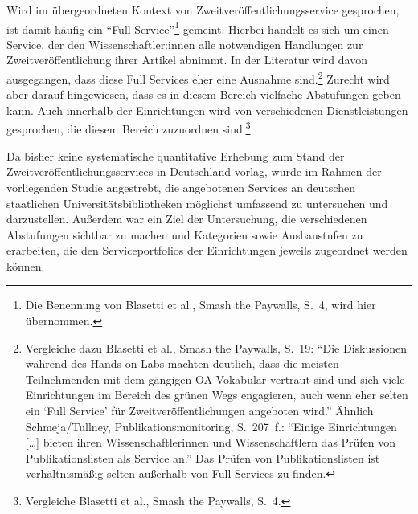 \documentclass[a4paper,
fontsize=11pt,
oneside,
numbers=noperiodatend,
parskip=half-,
bibliography=totoc,
final
]{scrartcl}
\begin{document}
Wird im übergeordneten Kontext von Zweitveröffentlichungsservice
gesprochen, ist damit häufig ein \enquote{Full Service}\footnote{Die
  Benennung von Blasetti et al., Smash the Paywalls, S.~4, wird hier
  übernommen.} gemeint. Hierbei handelt es sich um einen Service, der
den Wissenschaftler:innen alle notwendigen Handlungen zur
Zweitveröffentlichung ihrer Artikel abnimmt. In der Literatur wird davon
ausgegangen, dass diese Full Services eher eine Ausnahme
sind.\footnote{Vergleiche dazu Blasetti et al., Smash the Paywalls,
  S.~19: \enquote{Die Diskussionen während des Hands-on-Labs machten
  deutlich, dass die meisten Teilnehmenden mit dem gängigen OA-Vokabular
  vertraut sind und sich viele Einrichtungen im Bereich des grünen Wegs
  engagieren, auch wenn eher selten ein \enquote*{Full Service} für
  Zweitveröffentlichungen angeboten wird.} Ähnlich Schmeja/Tullney,
  Publikationsmonitoring, S.~207~f.: \enquote{Einige Einrichtungen
  {[}\ldots{]} bieten ihren Wissenschaftlerinnen und Wissenschaftlern
  das Prüfen von Publikationslisten als Service an.} Das Prüfen von
  Publikationslisten ist verhältnismäßig selten außerhalb von Full
  Services zu finden.} Zurecht wird aber darauf hingewiesen, dass es in
diesem Bereich vielfache Abstufungen geben kann. Auch innerhalb der
Einrichtungen wird von verschiedenen Dienstleistungen gesprochen, die
diesem Bereich zuzuordnen sind.\footnote{Vergleiche Blasetti et al.,
  Smash the Paywalls, S.~4.}

Da bisher keine systematische quantitative Erhebung zum Stand der
Zweitveröffentlichungsservices in Deutschland vorlag, wurde im Rahmen
der vorliegenden Studie angestrebt, die angebotenen Services an
deutschen staatlichen Universitätsbibliotheken möglichst umfassend zu
untersuchen und darzustellen. Außerdem war ein Ziel der Untersuchung,
die verschiedenen Abstufungen sichtbar zu machen und Kategorien sowie
Ausbaustufen zu erarbeiten, die den Serviceportfolios der Einrichtungen
jeweils zugeordnet werden können.
\end{document}
